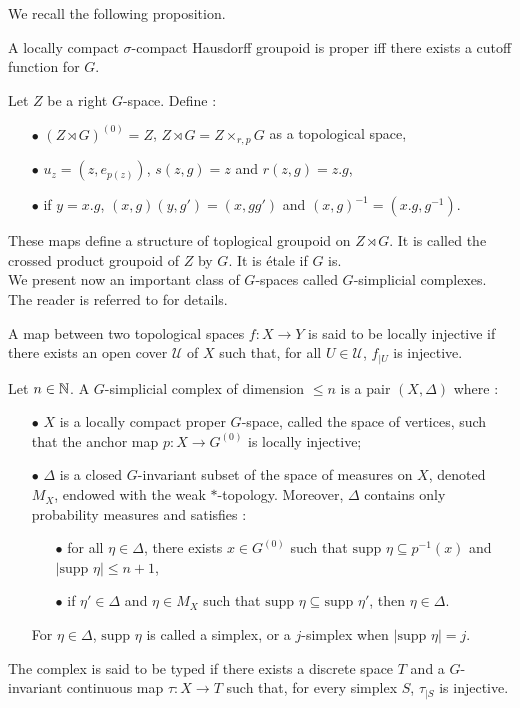 We recall the following proposition.

\begin{prop}
A locally compact $\sigma$-compact Hausdorff groupoid is proper iff there exists a cutoff function for $G$. 
\end{prop}

Let $Z$ be a right $G$-space. Define :
\begin{itemize}
\item[$\bullet$] $(Z\rtimes G)^{(0)} = Z$, $Z\rtimes G = Z\times_{r,p} G$ as a topological space,
\item[$\bullet$] $u_{z}= (z,e_{p(z)})$, $ s(z,g) = z$ and $r(z,g)=z.g$, 
\item[$\bullet$] if $y = x.g$, $(x,g)(y,g')= (x,gg') $ and $(x,g)^{-1} = (x.g,g^{-1})$.
\end{itemize}

These maps define a structure of toplogical groupoid on $Z\rtimes G$. It is called the crossed product groupoid of $Z$ by $G$. It is étale if $G$ is.\\

We present now an important class of $G$-spaces called $G$-simplicial complexes. The reader is referred to \cite{TuBC2} for details. 

\begin{definition}
A map between two topological spaces $f : X\rightarrow Y$ is said to be locally injective if there exists an open cover $\mathcal U$ of $X$ such that, for all $U\in \mathcal U$, $f_{|U}$ is injective.
\end{definition}

\begin{definition} \label{Gcomplex}
Let $n\in\mathbb N$. A $G$-simplicial complex of dimension $\leq n$ is a pair $(X,\Delta)$ where :
\begin{itemize}
\item[$\bullet$] $X$ is a locally compact proper $G$-space, called the space of vertices, such that the anchor map $p : X\rightarrow G^{(0)}$ is locally injective;
\item[$\bullet$] $\Delta$ is a closed $G$-invariant subset of the space of measures on $X$, denoted $M_X$, endowed with the weak $*$-topology. Moreover, $\Delta$ contains only probability measures and satisfies :
\begin{itemize}
\item[$\bullet$] for all $\eta\in\Delta$, there exists $x\in G^ {(0)}$ such that $\text{supp }\eta \subseteq p^{-1}(x)$ and $|\text{supp }\eta|\leq n+1$,
\item[$\bullet$] if $\eta' \in \Delta$ and $\eta\in M_X$ such that $\text{supp }\eta \subseteq \text{supp }\eta'$, then $\eta\in \Delta$.
\end{itemize}
For $\eta\in \Delta$, $\text{supp }\eta$ is called a simplex, or a $j$-simplex when $|\text{supp }\eta | = j$.
\end{itemize}
The complex is said to be typed if there exists a discrete space $T$ and a $G$-invariant continuous map $\tau : X\rightarrow T$ such that, for every simplex $S$, $\tau_{|S}$ is injective.  
\end{definition}

